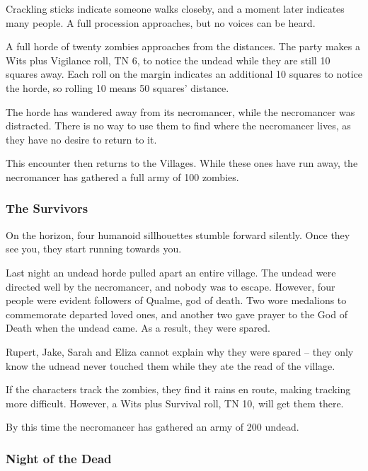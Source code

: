\begin{boxtext}
	Crackling sticks indicate someone walks closeby, and a moment later indicates many people.  A full procession approaches, but no voices can be heard.
\end{boxtext}

A full horde of twenty zombies approaches from the distances.  The party makes a Wits plus Vigilance roll, TN 6, to notice the undead while they are still 10 squares away.  Each roll on the margin indicates an additional 10 squares to notice the horde, so rolling 10 means 50 squares' distance.

The horde has wandered away from its necromancer, while the necromancer was distracted.  There is no way to use them to find where the necromancer lives, as they have no desire to return to it.

This encounter then returns to the Villages.  While these ones have run away, the necromancer has gathered a full army of 100 zombies.

\subsubsection{The Survivors}

\begin{boxtext}
	On the horizon, four humanoid sillhouettes stumble forward silently.  Once they see you, they start running towards you.
\end{boxtext}

Last night an undead horde pulled apart an entire village.  The undead were directed well by the necromancer, and nobody was to escape.  However, four people were evident followers of Qualme, god of death.  Two wore medalions to commemorate departed loved ones, and another two gave prayer to the God of Death when the undead came.  As a result, they were spared.

Rupert, Jake, Sarah and Eliza cannot explain why they were spared -- they only know the udnead never touched them while they ate the read of the village.

If the characters track the zombies, they find it rains en route, making tracking more difficult.  However, a Wits plus Survival roll, TN 10, will get them there.

By this time the necromancer has gathered an army of 200 undead.

\subsubsection{Night of the Dead}

